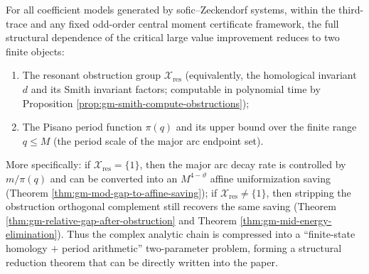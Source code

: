 \begin{theorem}\label{thm:gm-two-finite-objects-outline}
For all coefficient models generated by sofic--Zeckendorf systems, within the third-trace and any fixed odd-order central moment certificate framework, the full structural dependence of the critical large value improvement reduces to two finite objects:
\begin{enumerate}
  \item The resonant obstruction group \(\mathcal{X}_{\mathrm{res}}\) (equivalently, the homological invariant \(d\) and its Smith invariant factors; computable in polynomial time by Proposition \ref{prop:gm-smith-compute-obstructions});
  \item The Pisano period function \(\pi(q)\) and its upper bound over the finite range \(q\le M\) (the period scale of the major arc endpoint set).
\end{enumerate}
More specifically: if \(\mathcal{X}_{\mathrm{res}}=\{1\}\), then the major arc decay rate is controlled by \(m/\pi(q)\) and can be converted into an \(M^{4-\vartheta}\) affine uniformization saving (Theorem \ref{thm:gm-mod-gap-to-affine-saving});
if \(\mathcal{X}_{\mathrm{res}}\neq\{1\}\), then stripping the obstruction orthogonal complement still recovers the same saving (Theorem \ref{thm:gm-relative-gap-after-obstruction} and Theorem \ref{thm:gm-mid-energy-elimination}).
Thus the complex analytic chain is compressed into a ``finite-state homology \(+\) period arithmetic'' two-parameter problem, forming a structural reduction theorem that can be directly written into the paper.
\end{theorem}

\endinput
